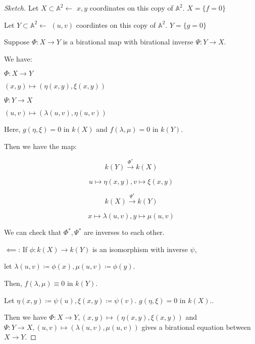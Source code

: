 \documentclass{article}
\theoremstyle{definition}
\begin{document}
        \begin{proof}
            [Sketch] Let \(X \subset \mathbb{A}^2 \leftarrow\) \(x,y\) coordinates on this copy of \(\mathbb{A}^2\). \(X = \{ f=0 \} \) 

            Let \(Y \subset \mathbb{A}^2 \leftarrow\) \((u,v)\) coordintes on this copy of \(\mathbb{A}^2\). \(Y = \{ g=0 \}\) 

            Suppose \(\Phi: X \to Y\) is a birational map with birational inverse \(\Psi: Y \to X\).

            We have:

            \(\Phi: X \to Y\) 

            \((x,y) \mapsto (\eta(x,y), \xi(x,y))\)
            
            \(\Psi: Y \to X\)
            
            \((u,v) \mapsto (\lambda(u,v),\eta(u,v))\) 

            Here, \(g(\eta,\xi)=0\) in \(k(X)\) and \(f(\lambda,\mu) = 0\) in \(k(Y)\).

            Then we have the map:

            \[
                k(Y) \xrightarrow{\Phi^{\ast}} k(X)
            \]

            \[
                u \mapsto \eta(x,y), v \mapsto \xi(x,y)
            \]

            \[
                k(X) \xrightarrow{\Psi^\ast} k(Y)
            \]
            
            \[
                x \mapsto \lambda(u,v), y \mapsto \mu(u,v)
            \]

            We can check that \(\Phi^{\ast}, \Psi^{\ast }\) are inverses to each other.

            \(\impliedby\): If \(\phi: k(X) \to k(Y)\) is an isomorphism with inverse \(\psi\),
            
            let \(\lambda(u,v)\coloneqq \phi(x), \mu(u,v) \coloneqq \phi(y)\).
            
            Then, \(f(\lambda ,\mu) \equiv 0\) in \(k(Y)\).

            Let \(\eta(x,y) \coloneqq \psi(u), \xi(x,y) \coloneqq \psi(v)\). \(g(\eta, \xi) =0\) in \(k(X)\)..
            
            Then we have \(\Phi:X \to Y, (x,y) \mapsto (\eta(x,y),\xi(x,y))\) and \(\Psi: Y \to X, (u,v) \mapsto (\lambda(u,v),\mu(u,v))\) gives a birational equation between \(X \to Y\).  
        \end{proof}
\end{document}
